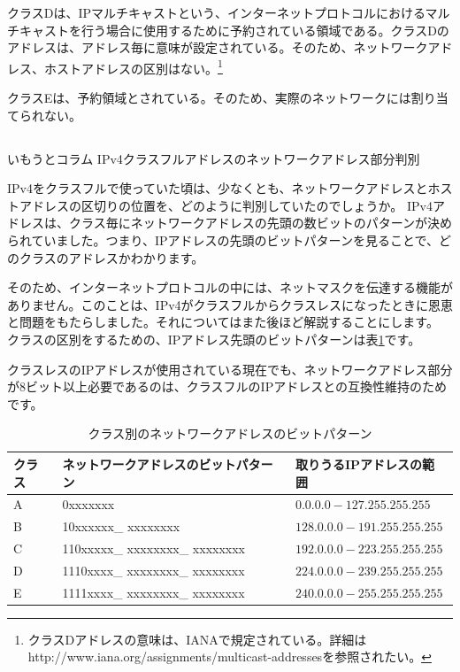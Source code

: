 クラスDは、IPマルチキャストという、インターネットプロトコルにおけるマルチキャストを行う場合に使用するために予約されている領域である。クラスDのアドレスは、アドレス毎に意味が設定されている。そのため、ネットワークアドレス、ホストアドレスの区別はない。\footnote{クラスDアドレスの意味は、IANAで規定されている。詳細はhttp://www.iana.org/assignments/multicast-addressesを参照されたい。}

クラスEは、予約領域とされている。そのため、実際のネットワークには割り当てられない。

\subsection*{}
\begin{itembox}[l]{いもうとコラム IPv4クラスフルアドレスのネットワークアドレス部分判別}

IPv4をクラスフルで使っていた頃は、少なくとも、ネットワークアドレスとホストアドレスの区切りの位置を、どのように判別していたのでしょうか。
IPv4アドレスは、クラス毎にネットワークアドレスの先頭の数ビットのパターンが決められていました。つまり、IPアドレスの先頭のビットパターンを見ることで、どのクラスのアドレスかわかります。

そのため、インターネットプロトコルの中には、ネットマスクを伝達する機能がありません。このことは、IPv4がクラスフルからクラスレスになったときに恩恵と問題をもたらしました。それについてはまた後ほど解説することにします。
クラスの区別をするための、IPアドレス先頭のビットパターンは表\ref{bitpattern}です。

クラスレスのIPアドレスが使用されている現在でも、ネットワークアドレス部分が8ビット以上必要であるのは、クラスフルのIPアドレスとの互換性維持のためです。


\end{itembox}

\begin{table}[hbtp] \caption{クラス別のネットワークアドレスのビットパターン} \label{bitpattern}
\begin{center}
\begin{tabularx}{110mm}{lll} \toprule
クラス & ネットワークアドレスのビットパターン & 取りうるIPアドレスの範囲\\ \midrule
A & 0xxxxxxx & $0.0.0.0-127.255.255.255$\\
B & 10xxxxxx\_ xxxxxxxx & $128.0.0.0-191.255.255.255$\\
C & 110xxxxx\_ xxxxxxxx\_ xxxxxxxx & $192.0.0.0-223.255.255.255$\\
D & 1110xxxx\_ xxxxxxxx\_ xxxxxxxx & $224.0.0.0-239.255.255.255$\\
E & 1111xxxx\_ xxxxxxxx\_ xxxxxxxx & $240.0.0.0-255.255.255.255$\\ \bottomrule
\end{tabularx}
\end{center}
\end{table}


